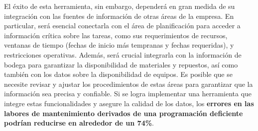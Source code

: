 \documentclass{article}
\begin{document}
\begin{appendix}
    El éxito de esta herramienta, sin embargo, dependerá en gran medida de su integración con las fuentes de información de otras áreas de la empresa. En particular, será esencial conectarla con el área de planificación para acceder a información crítica sobre las tareas, como sus requerimientos de recursos, ventanas de tiempo (fechas de inicio más tempranas y fechas requeridas), y restricciones operativas. Además, será crucial integrarla con la información de bodega para garantizar la disponibilidad de materiales y repuestos, así como también con los datos sobre la disponibilidad de equipos. Es posible que se necesite revisar y ajustar los procedimientos de estas áreas para garantizar que la información sea precisa y confiable. Si se logra implementar una herramienta que integre estas funcionalidades y asegure la calidad de los datos, los \textbf{errores en las labores de mantenimiento derivados de una programación deficiente podrían reducirse en alrededor de un 74\%}.
    
    
\end{appendix}

\printbibliography
\end{document}
